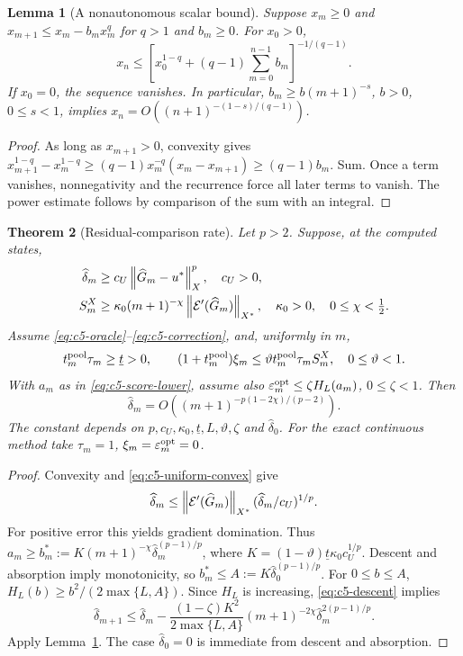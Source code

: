 \documentclass[11pt]{article}
\newtheorem{theorem}{Theorem}[section]
\newtheorem{lemma}[theorem]{Lemma}
\theoremstyle{remark}
\begin{document}
\begin{lemma}[A nonautonomous scalar bound]
\label{lem:c5-recurrence}
Suppose $x_m\geq0$ and
$x_{m+1}\leq x_m-b_mx_m^q$ for $q>1$ and $b_m\geq0$.
For $x_0>0$,
\begin{equation}
 x_n\leq\left[x_0^{1-q}+(q-1)\sum_{m=0}^{n-1}b_m\right]^{-1/(q-1)} .
 \label{eq:c5-recurrence}
\end{equation}
If $x_0=0$, the sequence vanishes. In particular,
$b_m\geq b(m+1)^{-s}$, $b>0$, $0\leq s<1$, implies
$x_n=O((n+1)^{-(1-s)/(q-1)})$.
\end{lemma}
\begin{proof}
As long as $x_{m+1}>0$, convexity gives
$x_{m+1}^{1-q}-x_m^{1-q}\geq
(q-1)x_m^{-q}(x_m-x_{m+1})\geq(q-1)b_m$.
Sum. Once a term vanishes, nonnegativity and the recurrence force all
later terms to vanish. The power estimate follows by comparison of the
sum with an integral.
\end{proof}

\begin{theorem}[Residual-comparison rate]
\label{thm:c5-visible}
Let $p>2$. Suppose, at the computed states,
\begin{align}
 \widehat\delta_m&\geq c_U\left\lVert\widehat G_m-u^*\right\rVert_X^p,\quad c_U>0,
 \label{eq:c5-uniform-convex}\\
 S_m^X&\geq\kappa_0(m+1)^{-\chi}
                   \left\lVert\mathcal E'(\widehat G_m)\right\rVert_{X^*},
 \quad\kappa_0>0,\quad0\leq\chi<\tfrac12 .
 \label{eq:c5-visible}
\end{align}
Assume \eqref{eq:c5-oracle}--\eqref{eq:c5-correction}, and, uniformly in $m$,
\[
 t_m^{\rm pool}\tau_m\geq\underline t>0,\qquad
 (1+t_m^{\rm pool})\xi_m
 \leq\vartheta t_m^{\rm pool}\tau_m S_m^X,\quad0\leq\vartheta<1 .
\]
With $a_m$ as in \eqref{eq:c5-score-lower}, assume also
$\varepsilon_m^{\rm opt}\leq\zeta H_L(a_m)$, $0\leq\zeta<1$.
Then
\begin{equation}
 \widehat\delta_m=O((m+1)^{-p(1-2\chi)/(p-2)}) .
 \label{eq:c5-visible-rate}
\end{equation}
The constant depends on $p,c_U,\kappa_0,\underline t,L,\vartheta,\zeta$ and
$\widehat\delta_0$. For the exact continuous method take
$\tau_m=1$, $\xi_m=\varepsilon_m^{\rm opt}=0$.
\end{theorem}
\begin{proof}
Convexity and \eqref{eq:c5-uniform-convex} give
\[
 \widehat\delta_m\leq
 \left\lVert\mathcal E'(\widehat G_m)\right\rVert_{X^*}
       (\widehat\delta_m/c_U)^{1/p}.
\]
For positive error this yields gradient domination.
Thus $a_m\geq b_m^*:=K(m+1)^{-\chi}
\widehat\delta_m^{(p-1)/p}$, where
$K=(1-\vartheta)\underline t\kappa_0c_U^{1/p}$.
Descent and absorption imply monotonicity, so
$b_m^*\leq A:=K\widehat\delta_0^{(p-1)/p}$.
For $0\leq b\leq A$,
$H_L(b)\geq b^2/(2\max\{L,A\})$.
Since $H_L$ is increasing, \eqref{eq:c5-descent} implies
\[
 \widehat\delta_{m+1}\leq\widehat\delta_m-
 \frac{(1-\zeta)K^2}{2\max\{L,A\}}
 (m+1)^{-2\chi}\widehat\delta_m^{2(p-1)/p}.
\]
Apply Lemma~\ref{lem:c5-recurrence}. The case $\widehat\delta_0=0$
is immediate from descent and absorption.
\end{proof}
\end{document}
